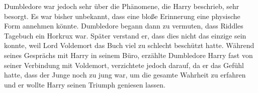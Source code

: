 \documentclass[a4paper, 10pt]{article}
\begin{document}
\vspace{10pt}
\newline
Dumbledore war jedoch sehr über die Phänomene, die Harry beschrieb, sehr besorgt. Es war bisher unbekannt, dass eine bloße Erinnerung eine physische Form annehmen könnte. Dumbledore begann dann zu vermuten, dass Riddles Tagebuch ein Horkrux war. Später verstand er, dass dies nicht das einzige sein konnte, weil Lord Voldemort das Buch viel zu schlecht beschützt hatte.
\vspace{10pt}
\newline
Während seines Gesprächs mit Harry in seinem Büro, erzählte Dumbledore Harry fast von seiner Verbindung mit Voldemort, verzichtete jedoch darauf, da er das Gefühl hatte, dass der Junge noch zu jung war, um die gesamte Wahrheit zu erfahren und er wollte Harry seinen Triumph geniesen lassen.
\end{document}
